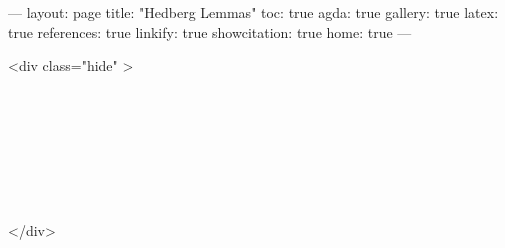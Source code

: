 ---
layout: page
title: "Hedberg Lemmas"
toc: true
agda: true
gallery: true
latex: true
references: true
linkify: true
showcitation: true
home: true
---


<div class="hide" >
\begin{code}%
\>[0]\AgdaSymbol{\{-\#}\AgdaSpace{}%
\AgdaSpace{}%
\AgdaSpace{}%
\AgdaSymbol{\#-\}}\<%
\\
\>[0]\AgdaSpace{}%
\AgdaSpace{}%
\<%
\\
\>[0]\AgdaSpace{}%
\AgdaSpace{}%
\<%
\\
\>[0]\AgdaSpace{}%
\AgdaSpace{}%
\<%
\\
\>[0]\AgdaSpace{}%
\AgdaSpace{}%
\<%
\\
\>[0]\AgdaSpace{}%
\AgdaSpace{}%
\<%
\\
\>[0]\AgdaSpace{}%
\AgdaSpace{}%
\<%
\end{code}
</div>

